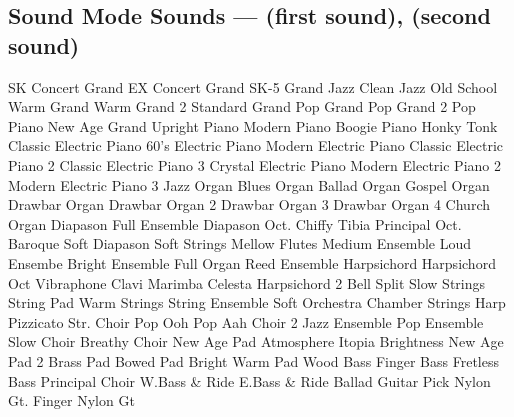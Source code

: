 \subsection{Sound Mode Sounds ---  (first sound),  (second sound)}
SK Concert Grand
EX Concert Grand
SK-5 Grand
Jazz Clean
Jazz Old School
Warm Grand
Warm Grand 2
Standard Grand
Pop Grand
Pop Grand 2
Pop Piano
New Age Grand
Upright Piano
Modern Piano
Boogie Piano
Honky Tonk
Classic Electric Piano
60's Electric Piano
Modern Electric Piano
Classic Electric Piano 2
Classic Electric Piano 3
Crystal Electric Piano
Modern Electric Piano 2
Modern Electric Piano 3
Jazz Organ
Blues Organ
Ballad Organ
Gospel Organ
Drawbar Organ
Drawbar Organ 2
Drawbar Organ 3
Drawbar Organ 4
Church Organ
Diapason
Full Ensemble
Diapason Oct.
Chiffy Tibia
Principal Oct.
Baroque
Soft Diapason
Soft Strings
Mellow Flutes
Medium Ensemble
Loud Ensembe
Bright Ensemble
Full Organ
Reed Ensemble
Harpsichord
Harpsichord Oct
Vibraphone
Clavi
Marimba
Celesta
Harpsichord 2
Bell Split
Slow Strings
String Pad
Warm Strings
String Ensemble
Soft Orchestra
Chamber Strings
Harp
Pizzicato Str.
Choir
Pop Ooh
Pop Aah
Choir 2
Jazz Ensemble
Pop Ensemble
Slow Choir
Breathy Choir
New Age Pad
Atmosphere
Itopia
Brightness
New Age Pad 2
Brass Pad
Bowed Pad
Bright Warm Pad
Wood Bass
Finger Bass
Fretless Bass
Principal Choir
W.Bass \& Ride
E.Bass \& Ride
Ballad Guitar
Pick Nylon Gt.
Finger Nylon Gt
